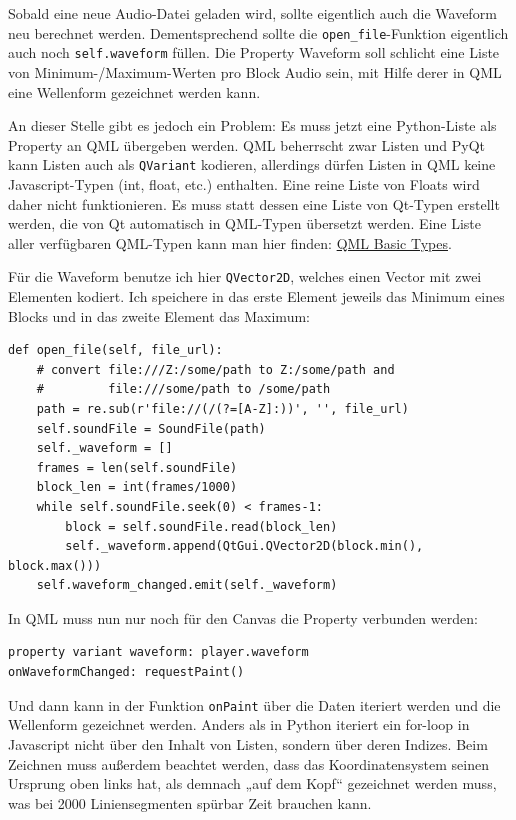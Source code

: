 \documentclass[a4paper]{article}
\begin{document}
Sobald eine neue Audio-Datei geladen wird, sollte eigentlich auch die Waveform neu berechnet werden. Dementsprechend sollte die \verb~open_file~-Funktion eigentlich auch noch \verb~self.waveform~ füllen. Die Property Waveform soll schlicht eine Liste von Minimum-/Maximum-Werten pro Block Audio sein, mit Hilfe derer in QML eine Wellenform gezeichnet werden kann.

An dieser Stelle gibt es jedoch ein Problem: Es muss jetzt eine Python-Liste als Property an QML übergeben werden. QML beherrscht zwar Listen und PyQt kann Listen auch als \verb~QVariant~ kodieren, allerdings dürfen Listen in QML keine Javascript-Typen (int, float, etc.) enthalten. Eine reine Liste von Floats wird daher nicht funktionieren. Es muss statt dessen eine Liste von Qt-Typen erstellt werden, die von Qt automatisch in QML-Typen übersetzt werden. Eine Liste aller verfügbaren QML-Typen kann man hier finden: \href{http://qt-project.org/doc/qt-5/qtqml-typesystem-basictypes.html}{QML Basic Types}.

Für die Waveform benutze ich hier \verb~QVector2D~, welches einen Vector mit zwei Elementen kodiert. Ich speichere in das erste Element jeweils das Minimum eines Blocks und in das zweite Element das Maximum:

\begin{verbatim}
def open_file(self, file_url):
    # convert file:///Z:/some/path to Z:/some/path and
    #         file:///some/path to /some/path
    path = re.sub(r'file://(/(?=[A-Z]:))', '', file_url)
    self.soundFile = SoundFile(path)
    self._waveform = []
    frames = len(self.soundFile)
    block_len = int(frames/1000)
    while self.soundFile.seek(0) < frames-1:
        block = self.soundFile.read(block_len)
        self._waveform.append(QtGui.QVector2D(block.min(), block.max()))
    self.waveform_changed.emit(self._waveform)
\end{verbatim}

In QML muss nun nur noch für den Canvas die Property verbunden werden:

\begin{verbatim}
property variant waveform: player.waveform
onWaveformChanged: requestPaint()
\end{verbatim}

Und dann kann in der Funktion \verb~onPaint~ über die Daten iteriert werden und die Wellenform gezeichnet werden. Anders als in Python iteriert ein for-loop in Javascript nicht über den Inhalt von Listen, sondern über deren Indizes. Beim Zeichnen muss außerdem beachtet werden, dass das Koordinatensystem seinen Ursprung oben links hat, als demnach „auf dem Kopf“ gezeichnet werden muss, was bei 2000 Liniensegmenten spürbar Zeit brauchen kann.
\end{document}
